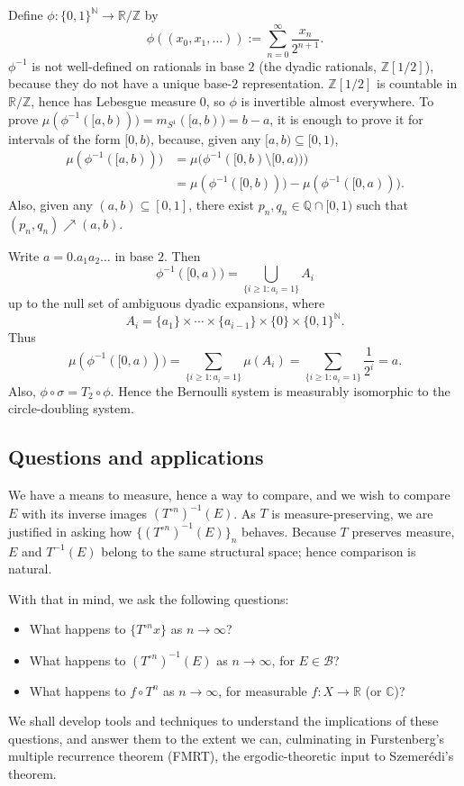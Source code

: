 \documentclass[11pt,a4paper]{article}
\begin{document}
\setcounter{example}{1}\begin{example}
Define $\phi\colon\{0,1\}^{\mathbb N}\to\mathbb R/\mathbb Z$ by
\[
  \phi((x_0,x_1,\ldots)):=\sum_{n=0}^{\infty}\frac{x_n}{2^{n+1}}.
\]
$\phi^{-1}$ is not well-defined on rationals in base $2$ (the dyadic
rationals, $\mathbb Z[1/2]$), because they do not have a unique base-$2$
representation. $\mathbb Z[1/2]$ is countable in $\mathbb R/\mathbb Z$, hence
has Lebesgue measure $0$, so $\phi$ is invertible almost everywhere.
To prove $\mu(\phi^{-1}([a,b)))=m_{S^1}([a,b))=b-a$, it is enough to prove
it for intervals of the form $[0,b)$, because, given any
$[a,b)\subseteq[0,1)$,
\begin{align*}
  \mu(\phi^{-1}([a,b)))
  &=\mu\bigl(\phi^{-1}([0,b)\setminus[0,a))\bigr)\\
  &=\mu(\phi^{-1}([0,b)))-\mu(\phi^{-1}([0,a))).
\end{align*}
Also, given any $(a,b)\subseteq[0,1]$, there exist
$p_n,q_n\in\mathbb Q\cap[0,1)$ such that $(p_n,q_n)\nearrow(a,b)$.

Write $a=0.a_1a_2\ldots$ in base $2$. Then
\[
  \phi^{-1}([0,a))=\bigcup_{\{i\geq1:a_i=1\}}A_i
\]
up to the null set of ambiguous dyadic expansions, where
\[
  A_i=\{a_1\}\times\cdots\times\{a_{i-1}\}\times\{0\}
  \times\{0,1\}^{\mathbb N}.
\]
Thus
\[
  \mu(\phi^{-1}([0,a)))
  =\sum_{\{i\geq1:a_i=1\}}\mu(A_i)
  =\sum_{\{i\geq1:a_i=1\}}\frac1{2^i}=a.
\]
Also, $\phi\circ\sigma=T_2\circ\phi$. Hence the Bernoulli system is
measurably isomorphic to the circle-doubling system.
\end{example}

\subsection{Questions and applications}
We have a means to measure, hence a way to compare, and we wish to compare
$E$ with its inverse images $(T^{\circ n})^{-1}(E)$. As $T$ is measure-preserving, we are
justified in asking how $\{(T^{\circ n})^{-1}(E)\}_n$ behaves. Because $T$ preserves
measure, $E$ and $T^{-1}(E)$ belong to the same structural space; hence
comparison is natural.

With that in mind, we ask the following questions:
\begin{itemize}
  \item What happens to $\{T^{\circ n}x\}$ as $n\to\infty$?
  \item What happens to $(T^{\circ n})^{-1}(E)$ as $n\to\infty$, for $E\in\mathcal B$?
  \item What happens to $f\circ T^n$ as $n\to\infty$, for measurable
  $f\colon X\to\mathbb R$ (or $\mathbb C$)?
\end{itemize}
We shall develop tools and techniques to understand the implications of these
questions, and answer them to the extent we can, culminating in Furstenberg's
multiple recurrence theorem (FMRT), the ergodic-theoretic input to
Szemer\'edi's theorem.
\end{document}

